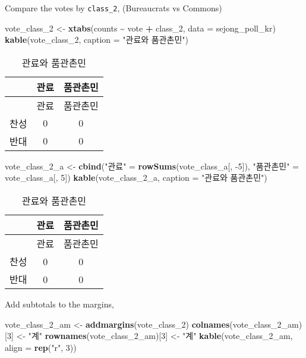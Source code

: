 \documentclass[
]{article}
\newenvironment{Shaded}{\begin{snugshade}}{\end{snugshade}}
\newcommand{\DataTypeTok}[1]{\textcolor[rgb]{0.13,0.29,0.53}{#1}}
\newcommand{\DecValTok}[1]{\textcolor[rgb]{0.00,0.00,0.81}{#1}}
\newcommand{\KeywordTok}[1]{\textcolor[rgb]{0.13,0.29,0.53}{\textbf{#1}}}
\newcommand{\NormalTok}[1]{#1}
\newcommand{\OperatorTok}[1]{\textcolor[rgb]{0.81,0.36,0.00}{\textbf{#1}}}
\newcommand{\StringTok}[1]{\textcolor[rgb]{0.31,0.60,0.02}{#1}}
\begin{document}
Compare the votes by \texttt{class\_2}, (Bureaucrats vs Commons)

\begin{Shaded}
\begin{Highlighting}[]
\NormalTok{vote\_class\_}\DecValTok{2}\NormalTok{ \textless{}{-}}\StringTok{ }\KeywordTok{xtabs}\NormalTok{(counts }\OperatorTok{\textasciitilde{}}\StringTok{ }\NormalTok{vote }\OperatorTok{+}\StringTok{ }\NormalTok{class\_}\DecValTok{2}\NormalTok{, }
                      \DataTypeTok{data =}\NormalTok{ sejong\_poll\_kr)}
\KeywordTok{kable}\NormalTok{(vote\_class\_}\DecValTok{2}\NormalTok{, }
      \DataTypeTok{caption =} \StringTok{"관료와 품관촌민"}\NormalTok{)}
\end{Highlighting}
\end{Shaded}

\begin{longtable}[]{@{}lcc@{}}
\caption{관료와 품관촌민}\tabularnewline
\toprule
& 관료 & 품관촌민\tabularnewline
\midrule
\endfirsthead
\toprule
& 관료 & 품관촌민\tabularnewline
\midrule
\endhead
찬성 & 0 & 0\tabularnewline
반대 & 0 & 0\tabularnewline
\bottomrule
\end{longtable}

\begin{Shaded}
\begin{Highlighting}[]
\NormalTok{vote\_class\_}\DecValTok{2}\NormalTok{\_a \textless{}{-}}\StringTok{ }\KeywordTok{cbind}\NormalTok{(}\StringTok{"관료"}\NormalTok{ =}\StringTok{ }\KeywordTok{rowSums}\NormalTok{(vote\_class\_a[, }\DecValTok{{-}5}\NormalTok{]), }
                        \StringTok{"품관촌민"}\NormalTok{ =}\StringTok{  }\NormalTok{vote\_class\_a[, }\DecValTok{5}\NormalTok{])}
\KeywordTok{kable}\NormalTok{(vote\_class\_}\DecValTok{2}\NormalTok{\_a, }
      \DataTypeTok{caption =} \StringTok{"관료와 품관촌민"}\NormalTok{)}
\end{Highlighting}
\end{Shaded}

\begin{longtable}[]{@{}lcc@{}}
\caption{관료와 품관촌민}\tabularnewline
\toprule
& 관료 & 품관촌민\tabularnewline
\midrule
\endfirsthead
\toprule
& 관료 & 품관촌민\tabularnewline
\midrule
\endhead
찬성 & 0 & 0\tabularnewline
반대 & 0 & 0\tabularnewline
\bottomrule
\end{longtable}

Add subtotals to the margins,

\begin{Shaded}
\begin{Highlighting}[]
\NormalTok{vote\_class\_}\DecValTok{2}\NormalTok{\_am \textless{}{-}}\StringTok{ }\KeywordTok{addmargins}\NormalTok{(vote\_class\_}\DecValTok{2}\NormalTok{)}
\KeywordTok{colnames}\NormalTok{(vote\_class\_}\DecValTok{2}\NormalTok{\_am)[}\DecValTok{3}\NormalTok{] \textless{}{-}}\StringTok{ "계"}
\KeywordTok{rownames}\NormalTok{(vote\_class\_}\DecValTok{2}\NormalTok{\_am)[}\DecValTok{3}\NormalTok{] \textless{}{-}}\StringTok{ "계"}
\KeywordTok{kable}\NormalTok{(vote\_class\_}\DecValTok{2}\NormalTok{\_am, }\DataTypeTok{align =} \KeywordTok{rep}\NormalTok{(}\StringTok{"r"}\NormalTok{, }\DecValTok{3}\NormalTok{))}
\end{Highlighting}
\end{Shaded}
\end{document}
